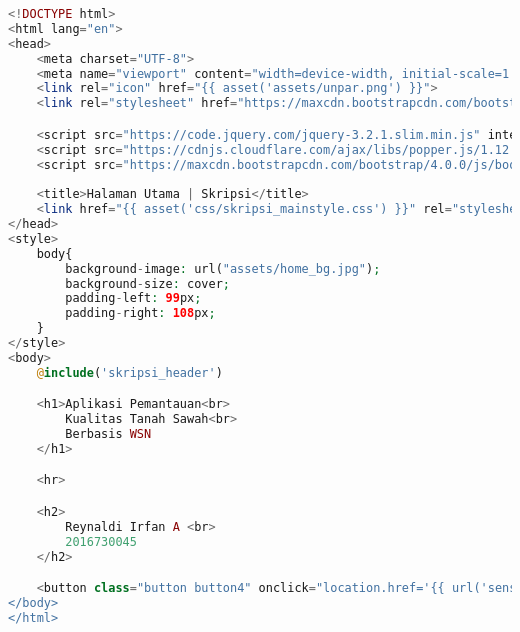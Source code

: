 \begin{lstlisting}[language=PHP, caption=skripsi\_home.blade.php]
<!DOCTYPE html>
<html lang="en">
<head>
    <meta charset="UTF-8">
    <meta name="viewport" content="width=device-width, initial-scale=1.0, shrink-to-fit=no">
    <link rel="icon" href="{{ asset('assets/unpar.png') }}">
    <link rel="stylesheet" href="https://maxcdn.bootstrapcdn.com/bootstrap/4.0.0/css/bootstrap.min.css" integrity="sha384-Gn5384xqQ1aoWXA+058RXPxPg6fy4IWvTNh0E263XmFcJlSAwiGgFAW/dAiS6JXm" crossorigin="anonymous">

    <script src="https://code.jquery.com/jquery-3.2.1.slim.min.js" integrity="sha384-KJ3o2DKtIkvYIK3UENzmM7KCkRr/rE9/Qpg6aAZGJwFDMVNA/GpGFF93hXpG5KkN" crossorigin="anonymous"></script>
    <script src="https://cdnjs.cloudflare.com/ajax/libs/popper.js/1.12.9/umd/popper.min.js" integrity="sha384-ApNbgh9B+Y1QKtv3Rn7W3mgPxhU9K/ScQsAP7hUibX39j7fakFPskvXusvfa0b4Q" crossorigin="anonymous"></script>
    <script src="https://maxcdn.bootstrapcdn.com/bootstrap/4.0.0/js/bootstrap.min.js" integrity="sha384-JZR6Spejh4U02d8jOt6vLEHfe/JQGiRRSQQxSfFWpi1MquVdAyjUar5+76PVCmYl" crossorigin="anonymous"></script>
    
    <title>Halaman Utama | Skripsi</title>
    <link href="{{ asset('css/skripsi_mainstyle.css') }}" rel="stylesheet" type="text/css" >
</head>
<style>
    body{
        background-image: url("assets/home_bg.jpg");
        background-size: cover;
        padding-left: 99px;
        padding-right: 108px;
    }
</style>
<body>
    @include('skripsi_header')

    <h1>Aplikasi Pemantauan<br> 
        Kualitas Tanah Sawah<br>
        Berbasis WSN
    </h1>

    <hr>

    <h2>
        Reynaldi Irfan A <br>
        2016730045
    </h2>

    <button class="button button4" onclick="location.href='{{ url('sensing') }}'">Let's Get Started</button>
</body>
</html>
\end{lstlisting}

